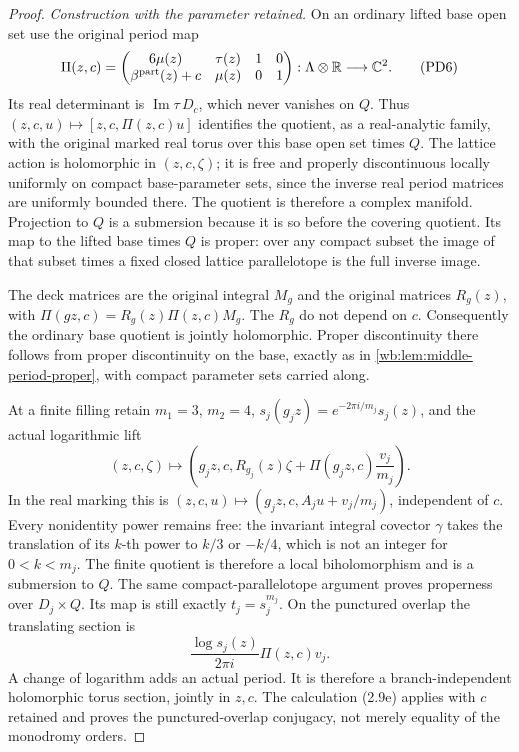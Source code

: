\begin{proof}
\emph{Construction with the parameter retained.}
On an ordinary lifted base open set use the original period map
\[
 \Pi(z,c)=
 \begin{pmatrix}
 6\mu(z)&\tau(z)&1&0\\
 \beta^{\rm part}(z)+c&\mu(z)&0&1
 \end{pmatrix}:
 \Lambda\otimes\mathbb R\longrightarrow\mathbb C^2.
 \tag{PD6}
\]
Its real determinant is $\operatorname{Im}\tau\,D_c$, which never
vanishes on $Q$. Thus $(z,c,u)\mapsto[z,c,\Pi(z,c)u]$ identifies the
quotient, as a real-analytic family, with the original marked real torus
over this base open set times $Q$. The lattice action is holomorphic in
$(z,c,\zeta)$; it is free and properly discontinuous locally uniformly
on compact base-parameter sets, since the inverse real period matrices
are uniformly bounded there. The quotient is therefore a complex
manifold. Projection to $Q$ is a submersion because it is so before
the covering quotient. Its map to the lifted base times $Q$ is proper:
over any compact subset the image of that subset times a fixed closed
lattice parallelotope is the full inverse image.

The deck matrices are the original integral $M_g$ and the original
matrices $R_g(z)$, with
$\Pi(gz,c)=R_g(z)\Pi(z,c)M_g$. The $R_g$ do not depend on $c$.
Consequently the ordinary base quotient is jointly holomorphic.
Proper discontinuity there follows from proper discontinuity on the
base, exactly as in \cref{wb:lem:middle-period-proper}, with compact
parameter sets carried along.

At a finite filling retain $m_1=3$, $m_2=4$,
$s_j(g_jz)=e^{-2\pi i/m_j}s_j(z)$, and the actual logarithmic lift
\[
 (z,c,\zeta)\longmapsto
 \left(g_jz,c,R_{g_j}(z)\zeta+
                  \Pi(g_jz,c)\frac{v_j}{m_j}\right).
 \tag{PD7}
\]
In the real marking this is $(z,c,u)\mapsto
(g_jz,c,A_ju+v_j/m_j)$, independent of $c$.
Every nonidentity power remains free: the invariant integral covector
$\gamma$ takes the translation of its $k$-th power to $k/3$ or $-k/4$,
which is not an integer for $0<k<m_j$.
The finite quotient is therefore a local biholomorphism and is a
submersion to $Q$. The same compact-parallelotope argument proves
properness over $D_j\times Q$. Its map is still exactly
$t_j=s_j^{m_j}$. On the punctured overlap the translating section is
\[
 \frac{\log s_j(z)}{2\pi i}\Pi(z,c)v_j.
 \tag{PD8}
\]
A change of logarithm adds an actual period. It is therefore a
branch-independent holomorphic torus section, jointly in $z,c$.
The calculation (2.9e) applies with $c$ retained and proves the
punctured-overlap conjugacy, not merely equality of the monodromy orders.


\end{proof}
